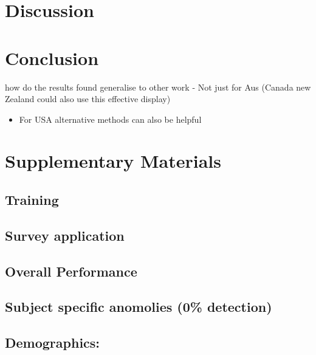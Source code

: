 \documentclass[conference,final,]{IEEEtran}
\providecommand{\tightlist}{%
  \setlength{\itemsep}{0pt}\setlength{\parskip}{0pt}}
\begin{document}
\hypertarget{discussion}{%
\section{Discussion}\label{discussion}}

\hypertarget{conclusion}{%
\section{Conclusion}\label{conclusion}}

how do the results found generalise to other work - Not just for Aus
(Canada new Zealand could also use this effective display)

\begin{itemize}
\tightlist
\item
  For USA alternative methods can also be helpful
\end{itemize}

\hypertarget{supplementary-materials}{%
\section{Supplementary Materials}\label{supplementary-materials}}

\hypertarget{training}{%
\subsection{Training}\label{training}}

\hypertarget{survey-application}{%
\subsection{Survey application}\label{survey-application}}

\hypertarget{overall-performance}{%
\subsection{Overall Performance}\label{overall-performance}}

\hypertarget{subject-specific-anomolies-0-detection}{%
\subsection{Subject specific anomolies (0\%
detection)}\label{subject-specific-anomolies-0-detection}}

\hypertarget{demographics}{%
\subsection{Demographics:}\label{demographics}}
\end{document}
